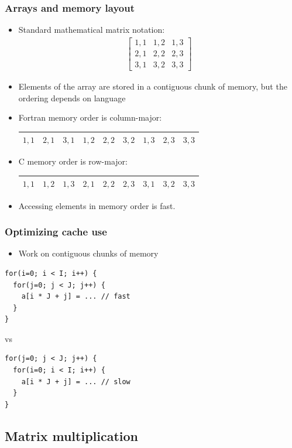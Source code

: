 \documentclass[usenames,dvipsnames,mathserif,compress]{beamer}
\begin{document}
\begin{frame}
  \frametitle{Arrays and memory layout}
  \begin{itemize}
  \item  Standard mathematical matrix notation:
  \begin{align}
    \left[
  \begin{matrix}
    1,1 & 1,2 & 1,3 \\
    2,1 & 2,2 & 2,3 \\
    3,1 & 3,2 & 3,3
  \end{matrix}
  \right]\nonumber
  \end{align}
\item Elements of the array are stored in a \alert{contiguous} chunk of memory,
  but the ordering depends on language
\item Fortran memory order is \alert{column-major}:
  \begin{tabular}{|c|c|c|c|c|c|c|c|c|}
    \hline
     $1,1$&$2,1$&$3,1$&$1,2$&$2,2$&$3,2$&$1,3$&$2,3$&$3,3$ \\\hline
  \end{tabular}
\item C memory order is \alert{row-major}:
  \begin{tabular}{|c|c|c|c|c|c|c|c|c|}
    \hline
     $1,1$&$1,2$&$1,3$&$2,1$&$2,2$&$2,3$&$3,1$&$3,2$&$3,3$ \\\hline
  \end{tabular}
\item Accessing elements in memory order is fast.
  \end{itemize}
\end{frame}

\begin{frame}[fragile]
  \frametitle{Optimizing cache use}
  \begin{itemize}
  \item Work on contiguous chunks of memory
  \end{itemize}
\begin{lstlisting}
for(i=0; i < I; i++) {
  for(j=0; j < J; j++) {
    a[i * J + j] = ... // fast
  }
}
\end{lstlisting}
vs
\begin{lstlisting}
for(j=0; j < J; j++) {
  for(i=0; i < I; i++) {
    a[i * J + j] = ... // slow
  }
}
\end{lstlisting}
\end{frame}

\subsection*{Matrix multiplication}
\end{document}
